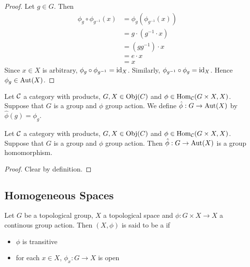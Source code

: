\documentclass{book}
\begin{document}
	\begin{proof}
		Let $g \in G$. Then 
		\begin{align*}
			\phi_g \circ \phi_{g^{-1}}(x) 
			& = \phi_g (\phi_{g^{-1}}(x)) \\
			& = g \cdot (g^{-1} \cdot x) \\
			& = (g g^{-1}) \cdot x \\
			& = e \cdot x \\
			& = x 
		\end{align*} 
		Since $x \in X$ is arbitrary, $\phi_g \circ \phi_{g^{-1}} = \operatorname{id}_X$. Similarly, $\phi_{g^{-1}} \circ \phi_g = \operatorname{id}_X$. Hence $\phi_g \in \operatorname{Aut}(X)$.
	\end{proof}

	\begin{defn}
		Let $\mathcal{C}$ a category with products, $G, X \in \operatorname{Obj}(C)$ and $\phi \in \operatorname{Hom}_{\mathcal{C}}( G \times X,  X)$. Suppose that $G$ is a group and $\phi$ group action. We define $\hat{\phi}: G \rightarrow \operatorname{Aut}(X)$ by $\hat{\phi}(g) = \phi_g$.
	\end{defn}

	\begin{ex}
		Let $\mathcal{C}$ a category with products, $G, X \in \operatorname{Obj}(C)$ and $\phi \in \operatorname{Hom}_{\mathcal{C}}( G \times X,  X)$. Suppose that $G$ is a group and $\phi$ group action. Then $\hat{\phi}: G \rightarrow \operatorname{Aut}(X)$ is a group homomorphism.
	\end{ex}

	\begin{proof}
		Clear by definition.
	\end{proof}

























	\subsection{Homogeneous Spaces}
	
	\begin{defn}
		Let $G$ be a topological group, $X$ a topological space and $\phi: G \times X \rightarrow X$ a continous group action. Then $(X, \phi)$ is said to be a  if
		\begin{itemize}
			\item $\phi$ is transitive
			\item for each $x \in X$, $\phi_x : G \rightarrow X$ is open
		\end{itemize} 
	\end{defn}
\end{document}
